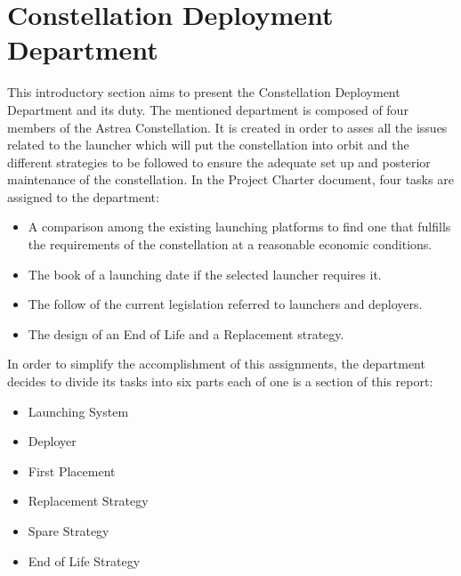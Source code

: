 

\section{Constellation Deployment Department}
This introductory section aims to present the Constellation Deployment Department and its duty. 
\newline\newline
The mentioned department is composed of four members of the Astrea Constellation. It is created in order to asses all the issues related to the launcher which will put the constellation into orbit and the different strategies to be followed to ensure the adequate set up and posterior maintenance of the constellation. 
In the Project Charter document, four tasks are assigned to the department:
\begin{itemize}
\item A comparison among the existing launching platforms to find one that fulfills the requirements of the constellation at a reasonable economic conditions. 
\item The book of a launching date if the selected launcher requires it.
\item The follow of the current legislation referred to launchers and deployers.
\item The design of an End of Life and a Replacement strategy.
\end{itemize}
In order to simplify the accomplishment of this assignments, the department decides to divide its tasks into six parts each of one is a section of this report:
\begin{itemize}
\item Launching System
\item Deployer
\item First Placement
\item Replacement Strategy
\item Spare Strategy
\item End of Life Strategy
\end{itemize}

